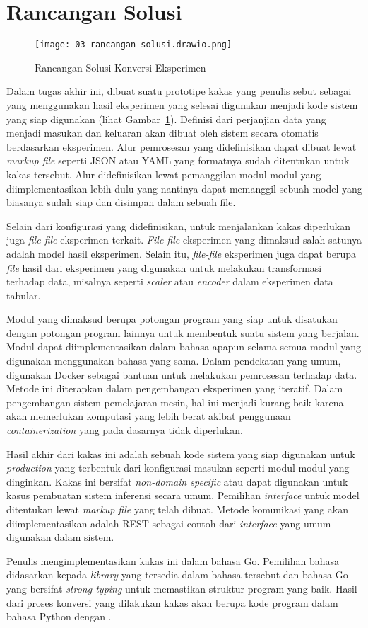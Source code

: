 \section{Rancangan Solusi}

\begin{figure}[ht]
  \centering
  \texttt{[image: 03-rancangan-solusi.drawio.png]}
  \caption{Rancangan Solusi Konversi Eksperimen}\label{fig:03-tool}
\end{figure}

Dalam tugas akhir ini, dibuat suatu prototipe kakas yang penulis sebut sebagai  yang menggunakan hasil eksperimen yang selesai digunakan menjadi kode sistem yang siap digunakan (lihat Gambar~\ref{fig:03-tool}).
Definisi dari perjanjian data yang menjadi masukan dan keluaran akan dibuat oleh sistem secara otomatis berdasarkan eksperimen.
Alur pemrosesan yang didefinisikan dapat dibuat lewat \textit{markup file} seperti JSON atau YAML yang formatnya sudah ditentukan untuk kakas tersebut.
Alur didefinisikan lewat pemanggilan modul-modul yang diimplementasikan lebih dulu yang nantinya dapat memanggil sebuah model yang biasanya sudah siap dan disimpan dalam sebuah file.

Selain dari konfigurasi yang didefinisikan, untuk menjalankan kakas diperlukan juga \textit{file-file} eksperimen terkait.
\textit{File-file} eksperimen yang dimaksud salah satunya adalah model hasil eksperimen.
Selain itu, \textit{file-file} eksperimen juga dapat berupa \textit{file} hasil dari eksperimen yang digunakan untuk melakukan transformasi terhadap data, misalnya seperti \textit{scaler} atau \textit{encoder} dalam eksperimen data tabular.

Modul yang dimaksud berupa potongan program yang siap untuk disatukan dengan potongan program lainnya untuk membentuk suatu sistem yang berjalan.
Modul dapat diimplementasikan dalam bahasa apapun selama semua modul yang digunakan menggunakan bahasa yang sama.
Dalam pendekatan yang umum, digunakan Docker sebagai bantuan untuk melakukan pemrosesan terhadap data.
Metode ini diterapkan dalam pengembangan eksperimen yang iteratif.
Dalam pengembangan sistem pemelajaran mesin, hal ini menjadi kurang baik karena akan memerlukan komputasi yang lebih berat akibat penggunaan \textit{containerization} yang pada dasarnya tidak diperlukan.

Hasil akhir dari kakas ini adalah sebuah kode sistem yang siap digunakan untuk \textit{production} yang terbentuk dari konfigurasi masukan seperti modul-modul yang dinginkan.
Kakas ini bersifat \textit{non-domain specific} atau dapat digunakan untuk kasus pembuatan sistem inferensi secara umum.
Pemilihan \textit{interface} untuk model ditentukan lewat \textit{markup file} yang telah dibuat.
Metode komunikasi yang akan diimplementasikan adalah REST sebagai contoh dari \textit{interface} yang umum digunakan dalam sistem.

Penulis mengimplementasikan kakas ini dalam bahasa Go.
Pemilihan bahasa didasarkan kepada \textit{library} yang tersedia dalam bahasa tersebut dan bahasa Go yang bersifat \textit{strong-typing} untuk memastikan struktur program yang baik.
Hasil dari proses konversi yang dilakukan kakas akan berupa kode program dalam bahasa Python dengan .


